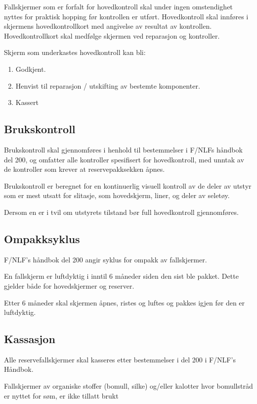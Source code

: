 Fallskjermer som er forfalt for hovedkontroll skal under ingen omstendighet nyttes for praktisk hopping før kontrollen er utført. Hovedkontroll skal innføres i skjermens hovedkontrollkort med angivelse av resultat av kontrollen. Hovedkontrollkort skal medfølge skjermen ved reparasjon og kontroller.

Skjerm som underkastes hovedkontroll kan bli:
\begin{enumerate}
	\item Godkjent.
	\item Henvist til reparasjon / utskifting av bestemte komponenter.
	\item Kassert
\end{enumerate}

\subsection{Brukskontroll}
\label{sec:Reservehandtak}
Brukskontroll skal gjennomføres i henhold til bestemmelser i F/NLFs håndbok del 200, og omfatter alle kontroller spesifisert for hovedkontroll, med unntak av de kontroller som krever at reservepakksekken åpnes.

Brukskontroll er beregnet for en kontinuerlig visuell kontroll av de deler av utstyr som er mest utsatt for slitasje, som hovedskjerm, liner, og deler av seletøy.

Dersom en er i tvil om utstyrets tilstand bør full hovedkontroll gjennomføres.

\subsection{Ompakksyklus}
F/NLF’s håndbok del 200 angir syklus for ompakk av fallskjermer.

En fallskjerm er luftdyktig i inntil 6 måneder siden den sist ble pakket. Dette gjelder både for hovedskjermer og reserver.

Etter 6 måneder skal skjermen åpnes, ristes og luftes og pakkes igjen før den er luftdyktig.

\subsection{Kassasjon}
Alle reservefallskjermer skal kasseres etter bestemmelser i del 200 i F/NLF’s Håndbok.

Fallskjermer av organiske stoffer (bomull, silke) og/eller kalotter hvor bomullstråd er nyttet for søm, er ikke tillatt brukt

